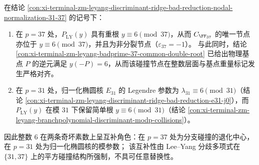 \begin{conclusion}[同一整数 \texorpdfstring{$6$}{6} 对两条奇坏素数轨道的互补控制：\texorpdfstring{$p=37$}{p=37} 为碰撞节点，\texorpdfstring{$p=31$}{p=31} 为归一化模参数]\label{con:xi-terminal-zm-leyang-discriminant-ridge-bad-reduction-6-dual-role}
在结论 \ref{con:xi-terminal-zm-leyang-discriminant-ridge-bad-reduction-nodal-normalization-31-37} 的记号下：
\begin{enumerate}
  \item 在 \(p=37\) 处，\(P_{\mathrm{LY}}(y)\) 具有重根 \(y\equiv 6\pmod{37}\)，从而 \(C_{\FF_{37}}\) 的唯一节点亦位于 \(y\equiv 6\pmod{37}\)，并且为非分裂节点（\(\varepsilon_{37}=-1\)）。
  与此同时，结论 \ref{con:xi-terminal-zm-leyang-badprime-37-common-double-root} 已给出物理基点 \(P\) 的逆元满足 \(y(-P)=6\)，从而该碰撞节点在整数层面与基点重量标记发生严格对齐。
  \item 在 \(p=31\) 处，归一化椭圆核 \(E_{31}\) 的 Legendre 参数为 \(\lambda_{31}\equiv 6\pmod{31}\)（结论 \ref{con:xi-terminal-zm-leyang-discriminant-ridge-bad-reduction-e31-j0}），而 \(P_{\mathrm{LY}}(y)\) 在模 \(31\) 下保留简单根 \(y\equiv 6\pmod{31}\)（结论 \ref{con:xi-terminal-zm-leyang-branchpolynomial-discriminant-modp-collisions}）。
\end{enumerate}
因此整数 \(6\) 在两条奇坏素数上呈互补角色：在 \(p=37\) 处为分支碰撞的退化中心，在 \(p=31\) 处为归一化椭圆核的模参数；
该互补性由 Lee--Yang 分歧多项式在 \(\{31,37\}\) 上的平方碰撞结构所强制，不具可任意替换性。
\end{conclusion}

